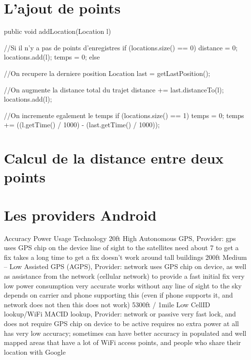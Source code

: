 \begin{appendices}
\chapter{L'ajout de points}

\label{Annexe1}
\begin{java}  
public void addLocation(Location l) {
	//Si il n'y a pas de points d'enregistres
	if (locations.size() == 0) {
		distance = 0;
		locations.add(l);
		temps = 0;
	} else {
	
	//On recupere la derniere position 
	Location last = getLastPosition();
	
	//On augmente la distance total du trajet 
	distance += last.distanceTo(l);
	locations.add(l);
 	
 	//On incremente egalement le temps 
	if (locations.size() == 1) {
		temps = 0;
	} 
	temps += ((l.getTime() / 1000) - (last.getTime() / 1000));   
	}
}
\end{java}

\chapter{Calcul de la distance entre deux points}
\label{Annexe2}

\chapter{Les providers Android}
\label{Annexe3}
Accuracy	Power Usage	Technology
20ft	High	Autonomous GPS, Provider: gps
uses GPS chip on the device
line of sight to the satellites
need about 7 to get a fix
takes a long time to get a fix
doesn’t work around tall buildings
200ft	Medium – Low	Assisted GPS (AGPS), Provider: network
uses GPS chip on device, as well as assistance from the network (cellular network) to provide a fast initial fix
very low power consumption
very accurate
works without any line of sight to the sky
depends on carrier and phone supporting this (even if phone supports it, and network does not then this does not work)
5300ft / 1mile	Low	CellID lookup/WiFi MACID lookup, Provider: network or passive
very fast lock, and does not require GPS chip on device to be active
requires no extra power at all
has very low accuracy; sometimes can have better accuracy in populated and well mapped areas that have a lot of WiFi access points, and people who share their location with Google
\end{appendices}